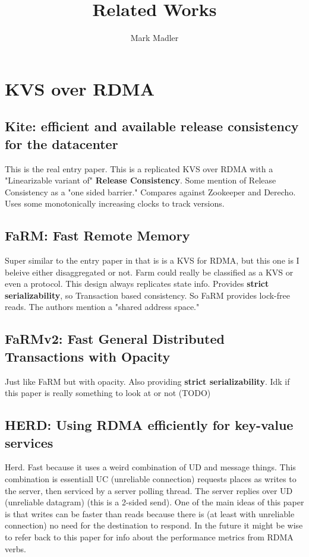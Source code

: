 \documentclass[sigplan,nonacm]{acmart}
\title{Related Works}
\author{Mark Madler}
\begin{document}
\maketitle


\section{KVS over RDMA}

    \subsection{Kite: efficient and available release consistency for the datacenter}
    This is the real entry paper. This is a replicated KVS over RDMA with a 
    "Linearizable variant of" \textbf{Release Consistency}. Some mention of Release Consistency
    as a "one sided barrier." Compares against Zookeeper and Derecho. Uses some 
    monotonically increasing clocks to track versions.\cite{Gavrielatos-PPoPP-2020} 

    \subsection{FaRM: Fast Remote Memory}
    Super similar to the entry paper in that is is a KVS for RDMA, but this one is I beleive either disaggregated or not. 
    Farm could really be classified as a KVS or even a protocol. This design always replicates state info. 
    Provides \textbf{strict serializability}, so Transaction based consistency.
    So FaRM provides lock-free reads. The authors mention
    a "shared address space." \cite{Dragojevic-NSDI-2014}

    \subsection{FaRMv2: Fast General Distributed Transactions with Opacity}
    Just like FaRM but with opacity. Also providing \textbf{strict serializability}.
    Idk if this paper is really something to look at or not (TODO)\cite{Shamis-SIGMOD-2019}

    \subsection{HERD: Using RDMA efficiently for key-value services}
    Herd. Fast because it uses a weird combination of UD and message things.
    This combination is essentiall UC (unreliable connection) requests places 
    as writes to the server, then serviced by a server polling thread. The server replies over 
    UD (unreliable datagram) (this is a 2-sided send). One of the main ideas 
    of this paper is that writes can be faster than reads because there is 
    (at least with unreliable connection) no need for the destination to respond. 
    In the future it might be wise to refer back to this paper for info about the performance 
    metrics from RDMA verbs.\cite {Kalia-SIGCOMM-2014}
\end{document}
